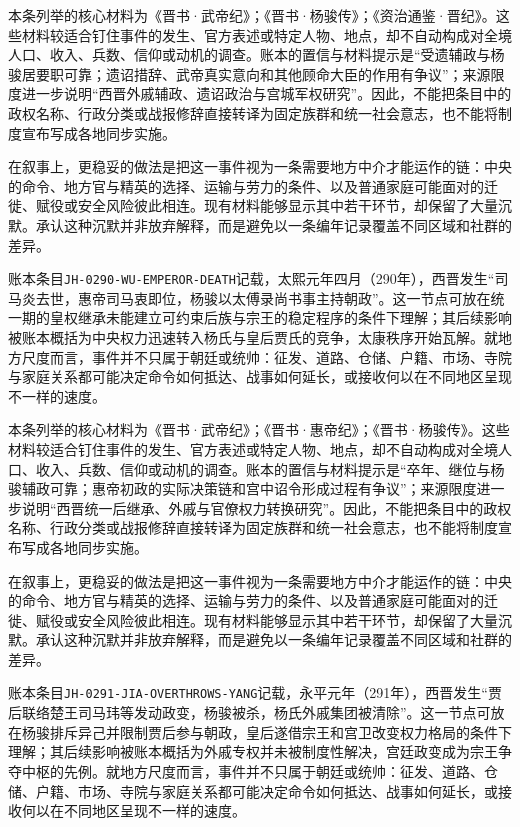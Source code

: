 本条列举的核心材料为《晋书·武帝纪》；《晋书·杨骏传》；《资治通鉴·晋纪》。这些材料较适合钉住事件的发生、官方表述或特定人物、地点，却不自动构成对全境人口、收入、兵数、信仰或动机的调查。账本的置信与材料提示是“受遗辅政与杨骏居要职可靠；遗诏措辞、武帝真实意向和其他顾命大臣的作用有争议”；来源限度进一步说明“西晋外戚辅政、遗诏政治与宫城军权研究”。因此，不能把条目中的政权名称、行政分类或战报修辞直接转译为固定族群和统一社会意志，也不能将制度宣布写成各地同步实施。

在叙事上，更稳妥的做法是把这一事件视为一条需要地方中介才能运作的链：中央的命令、地方官与精英的选择、运输与劳力的条件、以及普通家庭可能面对的迁徙、赋役或安全风险彼此相连。现有材料能够显示其中若干环节，却保留了大量沉默。承认这种沉默并非放弃解释，而是避免以一条编年记录覆盖不同区域和社群的差异。

账本条目\texttt{JH-0290-WU-EMPEROR-DEATH}记载，太熙元年四月（290年），西晋发生“司马炎去世，惠帝司马衷即位，杨骏以太傅录尚书事主持朝政”。这一节点可放在统一期的皇权继承未能建立可约束后族与宗王的稳定程序的条件下理解；其后续影响被账本概括为中央权力迅速转入杨氏与皇后贾氏的竞争，太康秩序开始瓦解。就地方尺度而言，事件并不只属于朝廷或统帅：征发、道路、仓储、户籍、市场、寺院与家庭关系都可能决定命令如何抵达、战事如何延长，或接收何以在不同地区呈现不一样的速度。

本条列举的核心材料为《晋书·武帝纪》；《晋书·惠帝纪》；《晋书·杨骏传》。这些材料较适合钉住事件的发生、官方表述或特定人物、地点，却不自动构成对全境人口、收入、兵数、信仰或动机的调查。账本的置信与材料提示是“卒年、继位与杨骏辅政可靠；惠帝初政的实际决策链和宫中诏令形成过程有争议”；来源限度进一步说明“西晋统一后继承、外戚与官僚权力转换研究”。因此，不能把条目中的政权名称、行政分类或战报修辞直接转译为固定族群和统一社会意志，也不能将制度宣布写成各地同步实施。

在叙事上，更稳妥的做法是把这一事件视为一条需要地方中介才能运作的链：中央的命令、地方官与精英的选择、运输与劳力的条件、以及普通家庭可能面对的迁徙、赋役或安全风险彼此相连。现有材料能够显示其中若干环节，却保留了大量沉默。承认这种沉默并非放弃解释，而是避免以一条编年记录覆盖不同区域和社群的差异。

账本条目\texttt{JH-0291-JIA-OVERTHROWS-YANG}记载，永平元年（291年），西晋发生“贾后联络楚王司马玮等发动政变，杨骏被杀，杨氏外戚集团被清除”。这一节点可放在杨骏排斥异己并限制贾后参与朝政，皇后遂借宗王和宫卫改变权力格局的条件下理解；其后续影响被账本概括为外戚专权并未被制度性解决，宫廷政变成为宗王争夺中枢的先例。就地方尺度而言，事件并不只属于朝廷或统帅：征发、道路、仓储、户籍、市场、寺院与家庭关系都可能决定命令如何抵达、战事如何延长，或接收何以在不同地区呈现不一样的速度。

